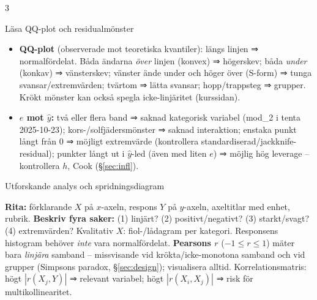 \documentclass[8pt]{extarticle}
\makeatletter
\newcounter{sect}
\newcommand{\sect}[3][hd]{\par\vspace{1.5pt}\refstepcounter{sect}\noindent
  {\setlength{\fboxsep}{1.8pt}\colorbox{#1}{\parbox{\dimexpr\linewidth-2\fboxsep}{\color{white}\sffamily\bfseries
  \strut\thesect\enspace #2}}}\label{#3}\par\nobreak\vspace{0.8pt}\@afterheading}
\newlength{\figunit}\setlength{\figunit}{1.07cm}%
\newcommand{\miniram}[2][1.6]{%
  \draw[gray!60] (0,-0.5) rectangle (#1,0.5);
  \node[font=\fontsize{5}{5.6}\selectfont\sffamily,anchor=north,align=center] at ({#1/2},-0.5) {#2};}
\newenvironment{figrad}{\par\vspace{1.5pt}\centering}{\par\vspace{1.5pt}}%
\makeatother
\begin{document}
\begin{multicols*}{3}
\begin{figrad}
\end{figrad}

\sect[cGrund]{Läsa QQ-plot och residualmönster}{sec:monster}
\begin{itemize}
\item \textbf{QQ-plot} (observerade mot teoretiska kvantiler): längs linjen ⇒ normalfördelat. Båda ändarna \emph{över} linjen (konvex) ⇒ högerskev; båda \emph{under} (konkav) ⇒ vänsterskev; vänster ände under och höger över (S-form) ⇒ tunga svansar/extremvärden; tvärtom ⇒ lätta svansar; hopp/trappsteg ⇒ grupper. Krökt mönster kan också spegla icke-linjäritet (kurssidan).
\item \textbf{$e$ mot $\hat y$:} två eller flera band ⇒ saknad kategorisk variabel (mod\_2 i tenta 2025-10-23); kors-/solfjädersmönster ⇒ saknad interaktion; enstaka punkt långt från 0 ⇒ möjligt extremvärde (kontrollera standardiserad/jackknife-residual); punkter långt ut i $\hat y$-led (även med liten $e$) ⇒ möjlig hög leverage – kontrollera $h$, Cook (§\ref{sec:infl}).
\end{itemize}

\sect[cGrund]{Utforskande analys och spridningsdiagram}{sec:utforska}
\textbf{Rita:} förklarande $X$ på $x$-axeln, respons $Y$ på $y$-axeln, axeltitlar med enhet, rubrik. \textbf{Beskriv fyra saker:} (1) linjärt? (2) positivt/negativt? (3) starkt/svagt? (4) extremvärden? Kvalitativ $X$: fiol-/lådagram per kategori. Responsens histogram behöver \emph{inte} vara normalfördelat.
\textbf{Pearsons $r$} ($-1\le r\le1$) mäter bara \emph{linjära} samband – missvisande vid krökta/icke-monotona samband och vid grupper (Simpsons paradox, §\ref{sec:design}); visualisera alltid. Korrelationsmatris: högt $|r(X_j,Y)|$ ⇒ relevant variabel; högt $|r(X_i,X_j)|$ ⇒ risk för multikollinearitet.


\end{multicols*}
\end{document}
